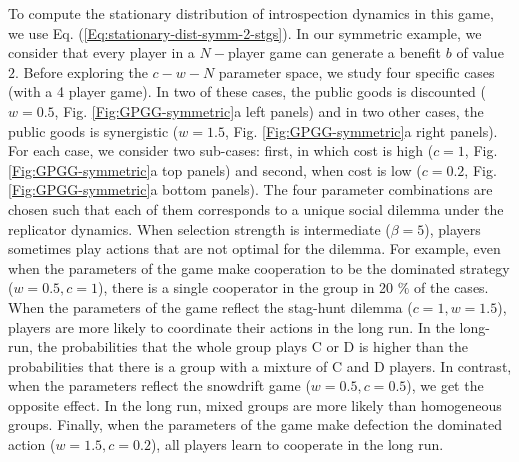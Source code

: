 \documentclass[11pt]{article}
\theoremstyle{plainCl1}
\theoremstyle{plainCl2}
\newcommand{\C}{\mathrm{C}}
\newcommand{\D}{\mathrm{D}}
\begin{document}
\noindent To compute the stationary distribution of introspection dynamics in this game, we use Eq. (\ref{Eq:stationary-dist-symm-2-stgs}). In our symmetric example, we consider that every player in a $N-$player game can generate a benefit $b$ of value $2$. Before exploring the $c-w-N$ parameter space, we study four specific cases (with a 4 player game).  In two of these cases, the public goods is discounted ($w = 0.5$, Fig. \ref{Fig:GPGG-symmetric}a left panels) and in two other cases, the public goods is synergistic ($w = 1.5$, Fig. \ref{Fig:GPGG-symmetric}a right panels). For each case, we consider two sub-cases: first, in which cost is high ($c = 1$,  Fig. \ref{Fig:GPGG-symmetric}a top panels) and second, when cost is low ($c = 0.2$, Fig. \ref{Fig:GPGG-symmetric}a bottom panels). The four parameter combinations are chosen such that each of them corresponds to a unique social dilemma under the replicator dynamics.  
When selection strength is intermediate ($\beta = 5$), players sometimes play actions that are not optimal for the dilemma. For example, even when the parameters of the game make cooperation to be the dominated strategy ($w = 0.5, c = 1$), there is a single cooperator in the group in 20 $\%$ of the cases. When the parameters of the game reflect the stag-hunt dilemma ($c = 1, w = 1.5$), players are more likely to coordinate their actions in the long run. In the long-run, the probabilities that the whole group plays $\C$ or $\D$ is higher than the probabilities that there is a group with a mixture of $\C$ and $\D$ players. In contrast, when the parameters reflect the snowdrift game ($w = 0.5, c = 0.5$), we get the opposite effect. In the long run, mixed groups are more likely than homogeneous groups. Finally, when the parameters of the game make defection the dominated action ($w = 1.5, c = 0.2$), all players learn to cooperate in the long run. \\ \\ 
\end{document}
